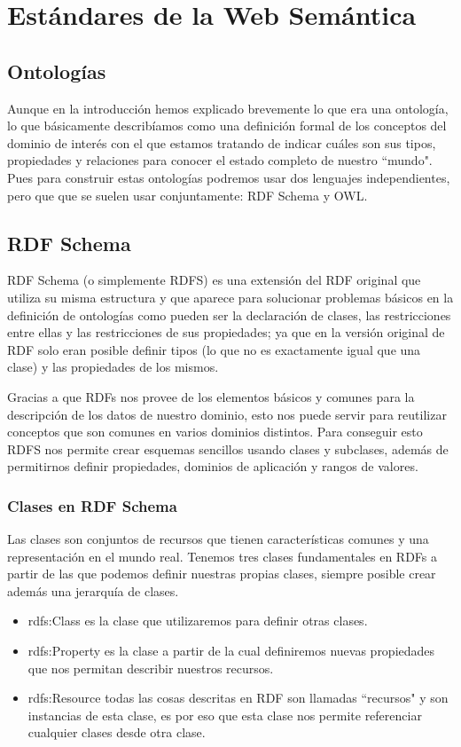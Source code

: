 \chapter{Estándares de la Web Semántica}

\section{Ontologías}
Aunque en la introducción hemos explicado brevemente lo que era una ontología, lo que básicamente describíamos como una definición formal de los conceptos del dominio de interés con el que estamos tratando de indicar cuáles son sus tipos, propiedades y relaciones para conocer el estado completo de nuestro ``mundo". Pues para construir estas ontologías podremos usar dos lenguajes independientes, pero que que se suelen usar conjuntamente: RDF Schema y OWL.

\section{RDF Schema}
RDF Schema (o simplemente RDFS) es una extensión del RDF original que utiliza su misma estructura y que aparece para solucionar problemas básicos en la definición de ontologías como pueden ser la declaración de clases, las restricciones entre ellas y las restricciones de sus propiedades; ya que en la versión original de RDF solo eran posible definir tipos (lo que no es exactamente igual que una clase) y las propiedades de los mismos.

\bigskip
Gracias a que RDFs nos provee de los elementos básicos y comunes para la descripción de los datos de nuestro dominio, esto nos puede servir para reutilizar conceptos que son comunes en varios dominios distintos. Para conseguir esto RDFS nos permite crear esquemas sencillos usando clases y subclases, además de permitirnos definir propiedades, dominios de aplicación y rangos de valores.

\newpage
\subsection{Clases en RDF Schema}
Las clases son conjuntos de recursos que tienen características comunes y una representación en el mundo real. Tenemos tres clases fundamentales en RDFs a partir de las que podemos definir nuestras propias clases, siempre posible crear además una jerarquía de clases.

	\begin{itemize}
		\item rdfs:Class es la clase que utilizaremos para definir otras clases.
		\item rdfs:Property es la clase a partir de la cual definiremos nuevas propiedades que nos permitan describir nuestros recursos.
		\item rdfs:Resource todas las cosas descritas en RDF son llamadas ``recursos" y son instancias de esta clase, es por eso que esta clase nos permite referenciar cualquier clases desde otra clase.
	\end{itemize}

